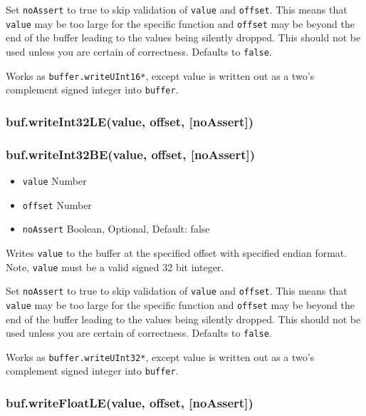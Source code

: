 Set \texttt{noAssert} to true to skip validation of \texttt{value} and
\texttt{offset}. This means that \texttt{value} may be too large for the
specific function and \texttt{offset} may be beyond the end of the
buffer leading to the values being silently dropped. This should not be
used unless you are certain of correctness. Defaults to \texttt{false}.

Works as \texttt{buffer.writeUInt16*}, except value is written out as a
two's complement signed integer into \texttt{buffer}.

\subsubsection{buf.writeInt32LE(value, offset,
{[}noAssert{]})}\label{buf.writeint32levalue-offset-noassert}

\subsubsection{buf.writeInt32BE(value, offset,
{[}noAssert{]})}\label{buf.writeint32bevalue-offset-noassert}

\begin{itemize}
\itemsep1pt\parskip0pt
\item
  \texttt{value} Number
\item
  \texttt{offset} Number
\item
  \texttt{noAssert} Boolean, Optional, Default: false
\end{itemize}

Writes \texttt{value} to the buffer at the specified offset with
specified endian format. Note, \texttt{value} must be a valid signed 32
bit integer.

Set \texttt{noAssert} to true to skip validation of \texttt{value} and
\texttt{offset}. This means that \texttt{value} may be too large for the
specific function and \texttt{offset} may be beyond the end of the
buffer leading to the values being silently dropped. This should not be
used unless you are certain of correctness. Defaults to \texttt{false}.

Works as \texttt{buffer.writeUInt32*}, except value is written out as a
two's complement signed integer into \texttt{buffer}.

\subsubsection{buf.writeFloatLE(value, offset,
{[}noAssert{]})}\label{buf.writefloatlevalue-offset-noassert}

